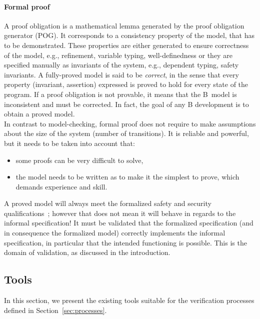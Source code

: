 \paragraph{Formal proof}
A proof obligation is a mathematical lemma generated by the proof obligation
generator (POG). It corresponds to a consistency property of the model, that has
to be demonstrated. These properties are either generated to ensure correctness
of the model, e.g., refinement, variable typing, well-definedness or they are
specified manually as invariants of the system, e.g., dependent typing, safety
invariants. A fully-proved model is said to be \textit{correct}, in the sense
that every property (invariant, assertion) expressed is proved to hold for every
state of the program. If a proof obligation is not provable, it means that the
B~model is inconsistent and must be corrected. In fact, the goal of any B
development is to obtain a proved model.\\
In contrast to model-checking, formal proof does not require to make assumptions
about the size of the system (number of transitions). It is reliable and
powerful, but it needs to be taken into account that:
\begin{itemize}
\item some proofs can be very difficult to solve,
\item the model needs to be written as to make it the simplest to prove, which demands experience and skill.
\end{itemize}
A proved model will always meet the formalized safety and security
qualifications~; however that does not mean it will behave in regards to the
informal specification! It must be validated that the formalized specification
(and in consequence the formalized model) correctly implements the informal
specification, in particular that the intended functioning is possible. This is
the domain of validation, as discussed in the introduction.

\subsection{Tools}
\label{sec:tools}

In this section, we present the existing tools suitable for the verification processes defined in Section~\ref{sec:processes}.

